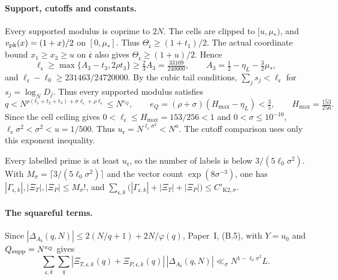 \paragraph{Support, cutoffs and constants.}
Every supported modulus is coprime to \(2N\). The cells are clipped
to \([u,\mu_*)\), and \(v_{\rm pk}(x)=(1+x)/2\) on \([0,\mu_*]\). Thus
\(\Theta_{\mathfrak c}\ge(1+t_1)/2\). The actual coordinate bound
\(x_1\ge x_3\ge u\) on \(\overline{\mathfrak c}\) also gives
\(\Theta_{\mathfrak c}\ge(1+u)/2\). Hence
\begin{equation}\label{eq:k2-r3-ell}
 \ell_{\mathfrak c}\ge\max\{A_3-t_3,2\rho t_3\}\ge\tfrac23A_3
 =\tfrac{33109}{240000},\qquad A_3=\tfrac12-\eta_L-\tfrac32\mu_*,
\end{equation}
and \(\ell_{\mathfrak c}-\ell_0\ge231463/24720000\). By the cubic tail
conditions, \(\sum_js_j<\ell_{\mathfrak c}\) for
\(s_j=\log_ND_j\). Thus every supported modulus satisfies
\begin{equation}\label{eq:k2-r3-support}
 q<N^{\rho(t_1+t_2+t_3)+\sigma\ell_{\mathfrak c}+\rho\ell_{\mathfrak c}}
 \le N^{e_Q},\qquad
 e_Q=(\rho+\sigma)(H_{\max}-\eta_L)<\tfrac35,\qquad H_{\max}=\tfrac{153}{256}.
\end{equation}
Since the cell ceiling gives \(0<\ell_{\mathfrak c}\le
H_{\max}=153/256<1\) and \(0<\sigma\le10^{-10}\),
\(\ell_{\mathfrak c}\sigma^2<\sigma^2<u=1/500\). Thus
\(u_{\mathfrak c}=N^{\ell_{\mathfrak c}\sigma^2}<N^u\). The cutoff
comparison uses only this exponent inequality.

Every labelled prime is at least \(u_{\mathfrak c}\), so the number of
labels is below \(3/(5\ell_0\sigma^2)\). With
\(M_\sigma=\lceil3/(5\ell_0\sigma^2)\rceil\) and the vector count
\(\exp(8\sigma^{-3})\), one has
\(|\Gamma_{\mathfrak c,k}|,|\Xi_{T}|,|\Xi_P|\le M_\sigma!\), and
\(\sum_{\mathfrak c,k}
 \bigl(|\Gamma_{\mathfrak c,k}|+|\Xi_T|+|\Xi_P|\bigr)
 \le C'_{\mathrm{K2},\sigma}\).

\paragraph{The squareful terms.}
Since \(|\Delta_{A_b}(q,N)|\le2(N/q+1)+2N/\varphi(q)\), Paper~I, (B.5),
with \(Y=u_0\) and \(Q_{\rm supp}=N^{e_Q}\) gives
\begin{equation}\label{eq:k2-r3-squareful}
 \sum_{\mathfrak c,k}\sum_q|\Xi_{T,\mathfrak c,k}(q)
 +\Xi_{P,\mathfrak c,k}(q)|\,|\Delta_{A_b}(q,N)|
 \ll_\sigma N^{1-\ell_0\sigma^2}L .
\end{equation}

